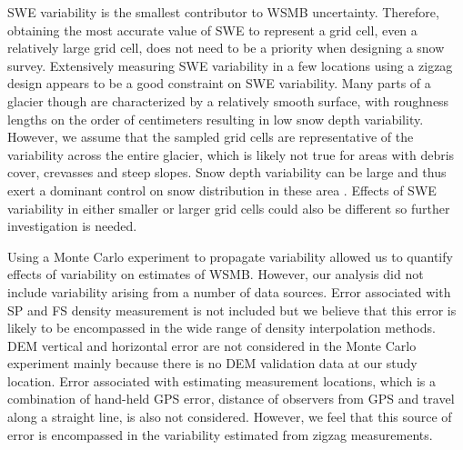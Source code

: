 \documentclass[12pt]{article}
\begin{document}
SWE variability is the smallest contributor to WSMB uncertainty. Therefore, obtaining the most accurate value of SWE to represent a grid cell, even a relatively large grid cell, does not need to be a priority when designing a snow survey. Extensively measuring SWE variability in a few locations using a zigzag design appears to be a good constraint on SWE variability. Many parts of a glacier though are characterized by a relatively smooth surface, with roughness lengths on the order of centimeters \citep{Hock2005} resulting in low snow depth variability. However, we assume that the sampled grid cells are representative of the variability across the entire glacier, which is likely not true for areas with debris cover, crevasses and steep slopes. Snow depth variability can be large and thus exert a dominant control on snow distribution in these area \citep{McGrath2015}. Effects of SWE variability in either smaller or larger grid cells could also be different so further investigation is needed.

Using a Monte Carlo experiment to propagate variability allowed us to quantify effects of variability on estimates of WSMB. However, our analysis did not include variability arising from a number of data sources. Error associated with SP and FS density measurement is not included but we believe that this error is likely to be encompassed in the wide range of density interpolation methods. DEM vertical and horizontal error are not considered in the Monte Carlo experiment mainly because there is no DEM validation data at our study location. Error associated with estimating measurement locations, which is a combination of hand-held GPS error, distance of observers from GPS and travel along a straight line, is also not considered. However, we feel that this source of error is encompassed in the variability estimated from zigzag measurements. 



\end{document}
